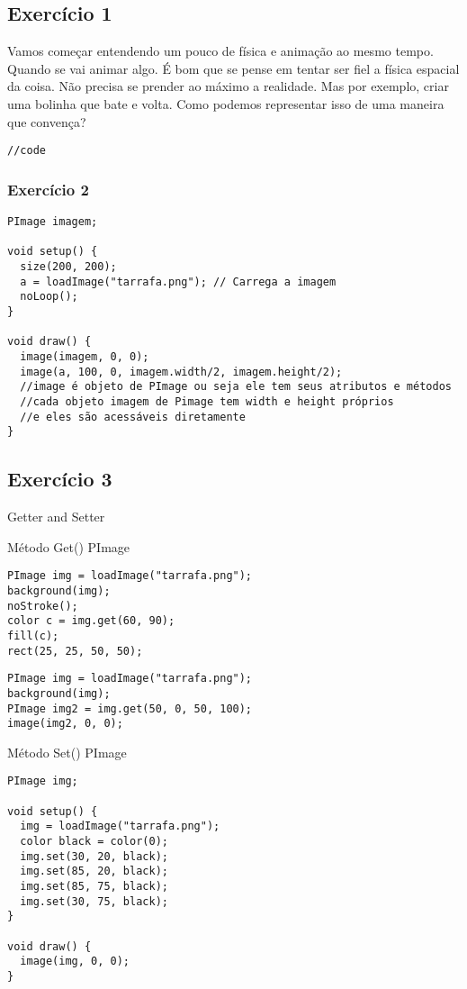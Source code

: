 \documentclass[12pt]{article}
\begin{document}
\subsection{Exercício 1}

\qquad Vamos começar entendendo um pouco de física e animação ao mesmo tempo. Quando se vai animar algo. É bom que se pense em tentar ser fiel a física espacial da coisa. Não precisa se prender ao máximo a realidade. Mas por exemplo, criar uma bolinha que bate e volta. Como podemos representar isso de uma maneira que convença?


\begin{verbatim}
//code
\end{verbatim}

\subsubsection{Exercício 2}

\begin{verbatim}
PImage imagem;

void setup() {
  size(200, 200);
  a = loadImage("tarrafa.png"); // Carrega a imagem
  noLoop();
}

void draw() {
  image(imagem, 0, 0);
  image(a, 100, 0, imagem.width/2, imagem.height/2);
  //image é objeto de PImage ou seja ele tem seus atributos e métodos
  //cada objeto imagem de Pimage tem width e height próprios
  //e eles são acessáveis diretamente
}
\end{verbatim}

\subsection{Exercício 3}

\qquad Getter and Setter

\qquad Método Get() PImage

\begin{verbatim}
PImage img = loadImage("tarrafa.png");
background(img);
noStroke();
color c = img.get(60, 90);
fill(c);
rect(25, 25, 50, 50);
\end{verbatim}

\begin{verbatim}
PImage img = loadImage("tarrafa.png");
background(img);
PImage img2 = img.get(50, 0, 50, 100); 
image(img2, 0, 0);
\end{verbatim}

\qquad Método Set() PImage

\begin{verbatim}
PImage img;

void setup() {
  img = loadImage("tarrafa.png");
  color black = color(0);
  img.set(30, 20, black); 
  img.set(85, 20, black); 
  img.set(85, 75, black); 
  img.set(30, 75, black); 
}

void draw() {
  image(img, 0, 0);
}
\end{verbatim}
\end{document}
